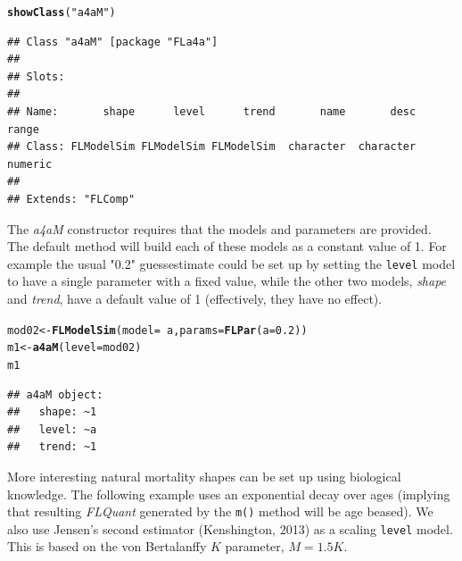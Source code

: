 \documentclass[a4paper,english,10pt]{article}\usepackage[]{graphicx}\usepackage[]{color}
\makeatletter
\newcommand{\hlnum}[1]{\textcolor[rgb]{0.686,0.059,0.569}{#1}}%
\newcommand{\hlstr}[1]{\textcolor[rgb]{0.192,0.494,0.8}{#1}}%
\newcommand{\hlopt}[1]{\textcolor[rgb]{0,0,0}{#1}}%
\newcommand{\hlstd}[1]{\textcolor[rgb]{0.345,0.345,0.345}{#1}}%
\newcommand{\hlkwb}[1]{\textcolor[rgb]{0.69,0.353,0.396}{#1}}%
\newcommand{\hlkwc}[1]{\textcolor[rgb]{0.333,0.667,0.333}{#1}}%
\newcommand{\hlkwd}[1]{\textcolor[rgb]{0.737,0.353,0.396}{\textbf{#1}}}%
\newenvironment{kframe}{%
 \def\at@end@of@kframe{}%
 \ifinner\ifhmode%
  \def\at@end@of@kframe{\end{minipage}}%
  \begin{minipage}{\columnwidth}%
 \fi\fi%
 \def\FrameCommand##1{\hskip\@totalleftmargin \hskip-\fboxsep
 \colorbox{shadecolor}{##1}\hskip-\fboxsep
     \hskip-\linewidth \hskip-\@totalleftmargin \hskip\columnwidth}%
 \MakeFramed {\advance\hsize-\width
   \@totalleftmargin\z@ \linewidth\hsize
   \@setminipage}}%
 {\par\unskip\endMakeFramed%
 \at@end@of@kframe}
\newenvironment{knitrout}{}{} %
\newcommand{\code}[1]{{\texttt{#1}}}
\newcommand{\class}[1]{{\textit{#1}}}
\makeatother
\begin{document}
\begin{knitrout}
\color{fgcolor}\begin{kframe}
\begin{alltt}
\hlkwd{showClass}\hlstd{(}\hlstr{"a4aM"}\hlstd{)}
\end{alltt}
\begin{verbatim}
## Class "a4aM" [package "FLa4a"]
## 
## Slots:
##                                                                         
## Name:       shape      level      trend       name       desc      range
## Class: FLModelSim FLModelSim FLModelSim  character  character    numeric
## 
## Extends: "FLComp"
\end{verbatim}
\end{kframe}
\end{knitrout}


The \class{a4aM} constructor requires that the models and parameters are provided. The default method will build each of these models as a constant value of 1. For example the usual "0.2" guessestimate could be set up by setting the \code{level} model to have a single parameter with a fixed value, while the other two models, \class{shape} and \class{trend}, have a default value of 1 (effectively, they have no effect).

\begin{knitrout}
\color{fgcolor}\begin{kframe}
\begin{alltt}
\hlstd{mod02} \hlkwb{<-} \hlkwd{FLModelSim}\hlstd{(}\hlkwc{model} \hlstd{=} \hlopt{~}\hlstd{a,} \hlkwc{params} \hlstd{=} \hlkwd{FLPar}\hlstd{(}\hlkwc{a} \hlstd{=} \hlnum{0.2}\hlstd{))}
\hlstd{m1} \hlkwb{<-} \hlkwd{a4aM}\hlstd{(}\hlkwc{level} \hlstd{= mod02)}
\hlstd{m1}
\end{alltt}
\begin{verbatim}
## a4aM object:
##   shape: ~1
##   level: ~a
##   trend: ~1
\end{verbatim}
\end{kframe}
\end{knitrout}


More interesting natural mortality shapes can be set up using biological knowledge. The following example uses an exponential decay over ages (implying that resulting \class{FLQuant} generated by the \code{m()} method will be age beased). We also use Jensen's second estimator (Kenshington, 2013) as a scaling \code{level} model. This is based on the von Bertalanffy $K$ parameter, $M=1.5K$. 
\end{document}
